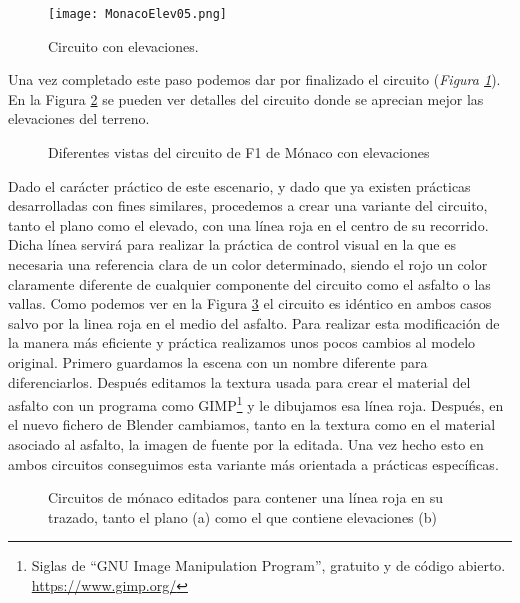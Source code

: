 \begin{figure}[hb]
	\centering
	\texttt{[image: MonacoElev05.png]}
	\caption{Circuito con elevaciones.} \label{fig:monacoelev05}
\end{figure}

Una vez completado este paso podemos dar por finalizado el circuito (\textit{Figura \ref{fig:monacoelev05}}). En la Figura \ref{fig:monacoelevvistas} se pueden ver detalles del circuito donde se aprecian mejor las elevaciones del terreno.

\begin{figure}[h]
	\centering
	\caption{Diferentes vistas del circuito de F1 de Mónaco con elevaciones} \label{fig:monacoelevvistas}
\end{figure}

Dado el carácter práctico de este escenario, y dado que ya existen prácticas desarrolladas con fines similares, procedemos a crear una variante del circuito, tanto el plano como el elevado, con una línea roja en el centro de su recorrido. Dicha línea servirá para realizar la práctica de control visual en la que es necesaria una referencia clara de un color determinado, siendo el rojo un color claramente diferente de cualquier componente del circuito como el asfalto o las vallas. Como podemos ver en la Figura \ref{fig:monacolinea} el circuito es idéntico en ambos casos salvo por la linea roja en el medio del asfalto. Para realizar esta modificación de la manera más eficiente y práctica realizamos unos pocos cambios al modelo original. Primero guardamos la escena con un nombre diferente para diferenciarlos. Después editamos la textura usada para crear el material del asfalto con un programa como GIMP\footnote{Siglas de “GNU Image Manipulation Program”, gratuito y de código abierto. \url{https://www.gimp.org/}} y le dibujamos esa línea roja. Después, en el nuevo fichero de Blender cambiamos, tanto en la textura como en el material asociado al asfalto, la imagen de fuente por la editada. Una vez hecho esto en ambos circuitos conseguimos esta variante más orientada a prácticas específicas. 

\begin{figure}[]
	\centering
	\caption[Circuitos con una línea roja]{Circuitos de mónaco editados para contener una línea roja en su trazado, tanto el plano (a) como el que contiene elevaciones (b)} \label{fig:monacolinea}
\end{figure}


